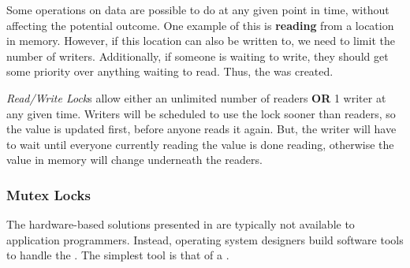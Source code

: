 Some operations on data are possible to do at any given point in time, without affecting the potential outcome.
One example of this is \textbf{reading} from a location in memory.
However, if this location can also be written to, we need to limit the number of writers.
Additionally, if someone is waiting to write, they should get some priority over anything waiting to read.
Thus, the  was created.

\begin{definition}\label{def:Read_Write_Lock}
  \emph{Read/Write Lock}s allow either an unlimited number of readers \textbf{OR} 1 writer at any given time.
  Writers will be scheduled to use the lock sooner than readers, so the value is updated first, before anyone reads it again.
  But, the writer will have to wait until everyone currently reading the value is done reading, otherwise the value in memory will change underneath the readers.
\end{definition}

\subsubsection{Mutex Locks}\label{subsubsec:Mutex_Locks}
The hardware-based solutions presented in  are typically not available to application programmers.
Instead, operating system designers build software tools to handle the .
The simplest tool is that of a .

